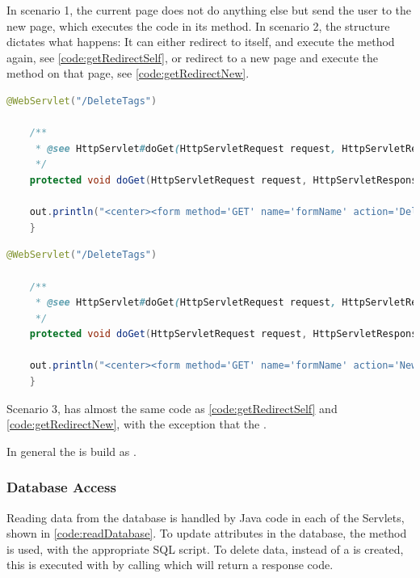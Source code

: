 In scenario 1, the current page does not do anything else but send the user to the new page, which executes the code in its  method. In scenario 2, the  structure dictates what happens: It can either redirect to itself, and execute the  method again, see \autoref{code:getRedirectSelf}, or redirect to a new page and execute the  method on that page, see \autoref{code:getRedirectNew}.

\begin{lstlisting}[language=Java,label=code:getRedirectSelf,caption=A \code{form} which redirect to its own get method]
	@WebServlet("/DeleteTags")
	
	/**
	 * @see HttpServlet#doGet(HttpServletRequest request, HttpServletResponse response)
	 */
	protected void doGet(HttpServletRequest request, HttpServletResponse response) throws ServletException, IOException {
	
	out.println("<center><form method='GET' name='formName' action='DeleteTags'>");
	}
\end{lstlisting}
\newpage
\begin{lstlisting}[language=Java,label=code:getRedirectNew,caption=A \code{form} which redirect to another page]
	@WebServlet("/DeleteTags")
	
	/**
	 * @see HttpServlet#doGet(HttpServletRequest request, HttpServletResponse response)
	 */
	protected void doGet(HttpServletRequest request, HttpServletResponse response) throws ServletException, IOException {
	
	out.println("<center><form method='GET' name='formName' action='NewPage'>");
	}
\end{lstlisting}

Scenario 3, has almost the same code as \autoref{code:getRedirectSelf} and \autoref{code:getRedirectNew}, with the exception that the .

In general the  is build as .

\subsubsection{Database Access}
Reading data from the database is handled by Java code in each of the Servlets, shown in \autoref{code:readDatabase}.
To update attributes in the database, the  method is used, with the appropriate SQL script.
To delete data, instead of  a  is created, this is executed with by calling  which will return a response code. 

